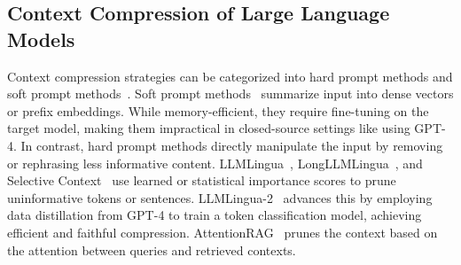 \documentclass[10pt,conference]{IEEEtran}
\newcommand{\todoc}[2]{{\textcolor{#1}{\textbf{[#2]}}}}
\newcommand{\shi}[1]{\todoc{orange}{Shi: #1}}
\begin{document}

\subsection{Context Compression of Large Language Models}

Context compression strategies can be categorized into hard prompt methods and soft prompt methods~\cite{li2024prompt}.
Soft prompt methods~\cite{mu2023learning, li2024500xcompressor, wang2024adapting} summarize input into dense vectors or prefix embeddings. While memory-efficient, they require fine-tuning on the target model, making them impractical in closed-source settings like using GPT-4. In contrast, hard prompt methods directly manipulate the input by removing or rephrasing less informative content. LLMLingua~\cite{jiang2023llmlingua}, LongLLMLingua~\cite{jiang2024longllmlingua}, and Selective Context~\cite{li2023compressing} use learned or statistical importance scores to prune uninformative tokens or sentences. LLMLingua-2~\cite{pan2024llmlingua} advances this by employing data distillation from GPT-4 to train a token classification model, achieving efficient and faithful compression. AttentionRAG~\cite{fang2025attentionrag} prunes the context based on the attention between queries and retrieved contexts.
\end{document}
